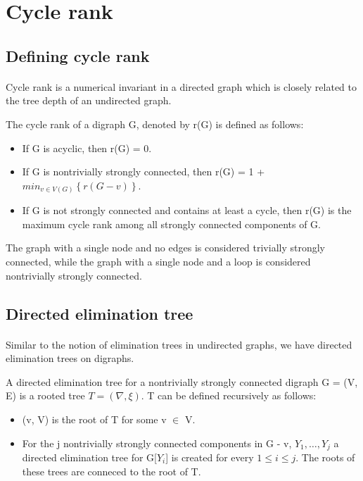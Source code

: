 \section{Cycle rank}

\subsection{Defining cycle rank}

\paragraph{}
Cycle rank is a numerical invariant in a directed graph which is closely related to the tree depth of an undirected graph.
\begin{definition}
The cycle rank of a digraph G, denoted by r(G) is defined as follows:

\begin{itemize}
\item If G is acyclic, then r(G) = 0.
\item If G is nontrivially strongly connected, then r(G) = 1 + $min_{v \in V(G)} \left\{r(G-v)\right\}$.
\item If G is not strongly connected and contains at least a cycle, then r(G) is the maximum cycle rank among all strongly connected components of G.
\end{itemize}

The graph with a single node and no edges is considered trivially strongly connected, while the graph with a single node and a loop is considered nontrivially strongly connected.

\end{definition}

\subsection{Directed elimination tree}

\paragraph{}
Similar to the notion of elimination trees in undirected graphs, we have directed elimination trees on digraphs.

\begin{definition}

A directed elimination tree for a nontrivially strongly connected digraph G = (V, E) is a rooted tree $T = (\nabla, \xi)$. T can be defined recursively as follows:

\begin{itemize}
\item (v, V) is the root of T for some v $\in$ V.
\item For the j nontrivially strongly connected components in G - v, $Y_1, \ldots, Y_j$ a directed elimination tree for G[$Y_i$] is created for every $1 \leq i \leq j$. The roots of these trees are conneced to the root of T.
\end{itemize}
\label{definition:DET}
\end{definition}

